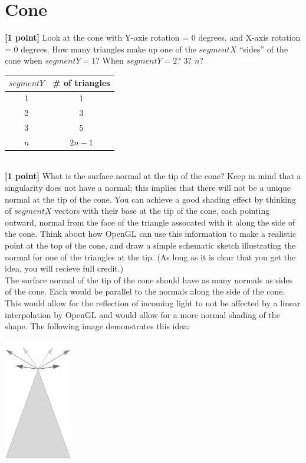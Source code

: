 \documentclass[10pt,twocolumn]{article}
\begin{document}
\section{Cone}
{\bf [1 point]} Look at the cone with Y-axis rotation = 0 degrees, and X-axis rotation = 0 degrees. How many triangles make up one of the $segmentX$ ``sides'' of the cone when $segmentY=1$? When $segmentY=2$? 3? $n$? 
\begin{tabular}{c|c}
$segmentY$ & \# of triangles \\ \hline
1 & 1 \\
2 & 3 \\
3 & 5 \\
$n$ & $2n - 1$
\end{tabular}
\vspace{2em}\\
{\bf [1 point]} What is the surface normal at the tip of the cone? Keep in mind that a singularity does not have a normal; this implies that there will not be a unique normal at the tip of the cone. You can achieve a good shading effect by thinking of $segmentX$ vectors with their base at the tip of the cone, each pointing outward, normal from the face of the triangle assocated with it along the side of the cone. Think about how OpenGL can use this information to make a realistic point at the top of the cone, and draw a simple schematic sketch illustrating the normal for one of the triangles at the tip. (As long as it is clear that you get the idea, you will recieve full credit.)
\vspace{2em}\\
The surface normal of the tip of the cone should have as many normals as sides of the cone. Each would be parallel to the normals along the side of the cone. This would allow for the reflection of incoming light to not be affected by a linear interpolation by OpenGL and would allow for a more normal shading of the shape. The following image demonstrates this idea: \\
\begin{center}
\includegraphics[width=8em]{graphicshw1cone} \\
\end{center}
\end{document}
